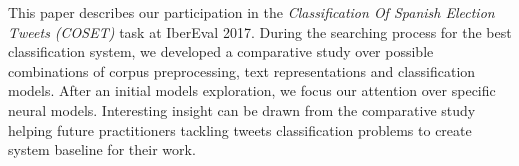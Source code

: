 \abstract

This paper describes our participation in the \emph{Classification Of Spanish Election Tweets (COSET)} task at IberEval 2017.
During the searching process for the best classification system, we developed a comparative study over possible combinations of corpus preprocessing, text representations and classification models. After an initial models exploration, we focus our attention over specific neural models.
Interesting insight can be drawn from the comparative study helping future practitioners tackling tweets classification problems to create system baseline for their work.
